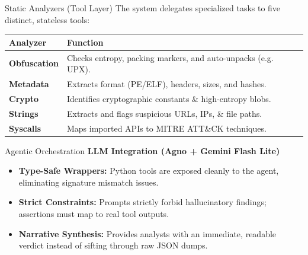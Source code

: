 \documentclass[aspectratio=169,11pt]{beamer}
\begin{document}
\begin{frame}{Static Analyzers (Tool Layer)}
    The system delegates specialized tasks to five distinct, stateless tools:
    \vspace{1em}
    
    \begin{table}
        \centering
        \renewcommand{\arraystretch}{1.4}
        \begin{tabular}{p{3cm} p{10.5cm}}
            \toprule
            \textbf{\color{primary}Analyzer} & \textbf{\color{primary}Function} \\
            \midrule
            \textbf{Obfuscation} & Checks entropy, packing markers, and auto-unpacks (e.g. UPX). \\
            \textbf{Metadata} & Extracts format (PE/ELF), headers, sizes, and hashes. \\
            \textbf{Crypto} & Identifies cryptographic constants \& high-entropy blobs. \\
            \textbf{Strings} & Extracts and flags suspicious URLs, IPs, \& file paths. \\
            \textbf{Syscalls} & Maps imported APIs to MITRE ATT\&CK techniques. \\
            \bottomrule
        \end{tabular}
    \end{table}
\end{frame}

\begin{frame}{Agentic Orchestration}
    \textbf{LLM Integration (Agno + Gemini Flash Lite)}
    \vspace{1em}
    
    \begin{itemize}
        \item \textbf{Type-Safe Wrappers:} Python tools are exposed cleanly to the agent, eliminating signature mismatch issues.
        \item \textbf{Strict Constraints:} Prompts strictly forbid hallucinatory findings; assertions must map to real tool outputs.
        \item \textbf{Narrative Synthesis:} Provides analysts with an immediate, readable verdict instead of sifting through raw JSON dumps.
    \end{itemize}
\end{frame}
\end{document}
